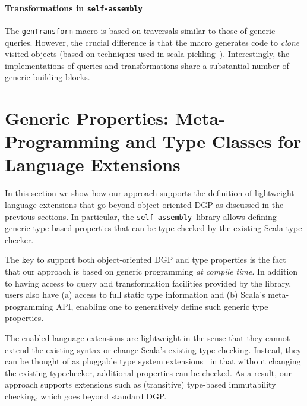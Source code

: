 \documentclass[preprint,nocopyrightspace]{sigplanconf}
\newcommand{\selfassembly}{\texttt{self-assembly~}}
\begin{document}
\paragraph{Transformations in \selfassembly}
The \verb|genTransform| macro is based on traversals similar to those of
generic queries. However, the crucial difference is that the macro generates
code to {\em clone} visited objects (based on techniques used in
scala-pickling~\cite{Pickling}). Interestingly, the implementations of queries and
transformations share a substantial number of generic building blocks.


\section{Generic Properties: Meta-Programming and Type Classes for Language Extensions}
\label{sec:language-extensions}

In this section we show how our approach supports the definition of
lightweight language extensions that go beyond object-oriented DGP as
discussed in the previous sections. In particular, the \selfassembly library
allows defining generic type-based properties that can be type-checked by the
existing Scala type checker.


The key to support both object-oriented DGP and type properties is the fact
that our approach is based on generic programming {\em at compile time}. In
addition to having access to query and transformation facilities provided by
the library, users also have (a) access to full static type information and
(b) Scala's meta-programming API, enabling one to generatively define such
generic type properties.

The enabled language extensions are lightweight in the sense that they cannot
extend the existing syntax or change Scala’s existing type-checking. Instead,
they can be thought of as pluggable type system
extensions~\cite{PluggableTypes} in that without changing the existing
typechecker, additional properties can be checked. As a result, our approach
supports extensions such as (transitive) type-based immutability checking,
which goes beyond standard DGP.
\end{document}
